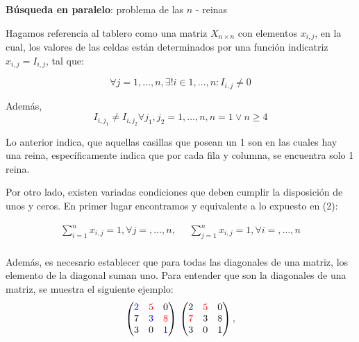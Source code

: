 \documentclass[letterpaper,11pt,spanish]{article}
\author{}
\date{}
\title{}
\begin{document}

\begin{center}
{\Large{\textbf{Búsqueda en paralelo}: problema de las $n$ - reinas}}
\end{center}


Hagamos referencia al tablero como una matriz $X_{n\times n}$ con elementos $x_{i,j}$, en la cual, los valores de las celdas están determinados por una función indicatriz $x_{i,j} = I_{i,j}$, tal que:

\begin{equation}
\forall j = 1,\ldots,n, \exists! i \in {1,\ldots,n}: I_{i,j} \neq 0 
\end{equation}

Además,
\begin{equation}
I_{i,j_1} \neq I_{i,j_2} \forall j_1,j_2 = 1,\ldots,n, n=1 \vee n\geq 4
\end{equation}

Lo anterior indica, que aquellas casillas que posean un 1 son en las cuales hay una reina, específicamente indica que por cada fila y columna, se encuentra solo 1 reina.

Por otro lado, existen variadas condiciones que deben cumplir la disposición de unos y ceros. En primer lugar encontramos y equivalente a lo expuesto en (2):

\begin{equation}
\begin{split}
\sum_{i=1}^n x_{i,j} = 1, \forall j = ,\ldots,n, \text{  }  \text{  }
\sum_{j=1}^n x_{i,j} = 1, \forall i = ,\ldots,n\\
\end{split}
\end{equation}

Además, es necesario establecer que para todas las diagonales de una matriz, los elemento de la diagonal suman uno. Para entender que son la diagonales de una matriz, se muestra el siguiente  ejemplo:
\begin{equation}
\begin{pmatrix}
\color{blue}{2} & \color{red}{5} & 0\\
7 & \color{blue}{3} & \color{red}{8}\\
3 & 0 & \color{blue}{1}
\end{pmatrix}\\
\begin{pmatrix}
2 & \color{red}{5} & 0\\
\color{red}{7} & 3 & 8\\
3 & 0 & 1
\end{pmatrix},
\end{equation}
\end{document}
